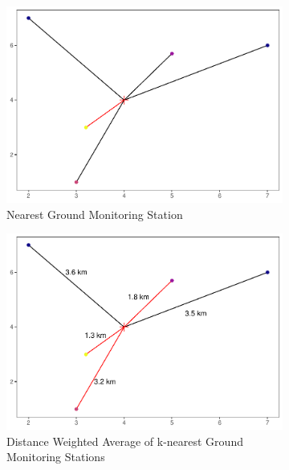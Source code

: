 \begin{figure}
    \begin{subfigure}{.33\textwidth}
        \centering
        \includegraphics[width=\linewidth]{Images/nearest.pdf}
        \caption{Nearest Ground Monitoring Station}
        \label{fig:nearest}
    \end{subfigure}%
    \begin{subfigure}{.33\textwidth}
        \centering
        \includegraphics[width=\linewidth]{Images/inter.pdf}
        \caption{Distance Weighted Average of k-nearest Ground Monitoring Stations}
        \label{fig:inter}
    \end{subfigure}
    \begin{subfigure}{.33\textwidth}
        \centering

\end{subfigure}
\end{figure}
